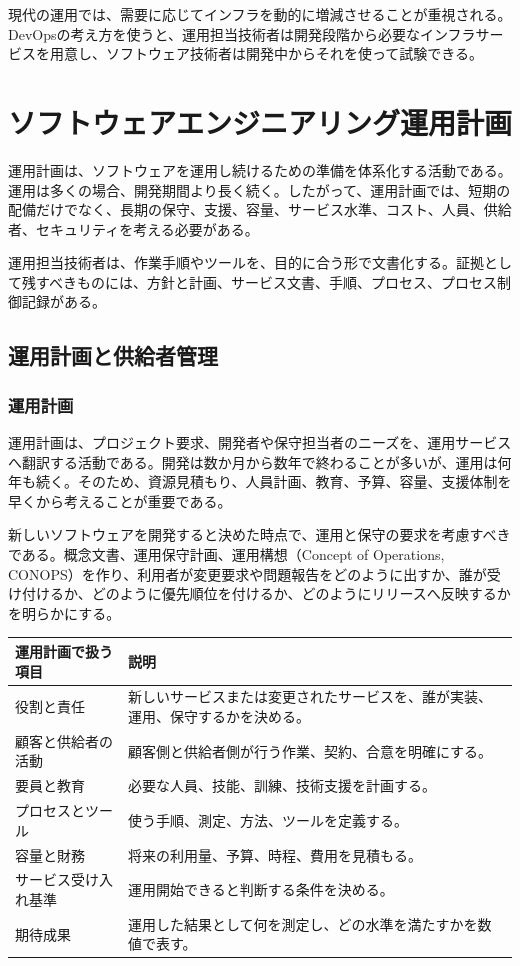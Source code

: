 \documentclass[uplatex,dvipdfmx,a4paper,10pt]{jsarticle}
\begin{document}
現代の運用では、需要に応じてインフラを動的に増減させることが重視される。DevOpsの考え方を使うと、運用担当技術者は開発段階から必要なインフラサービスを用意し、ソフトウェア技術者は開発中からそれを使って試験できる。

\section{ソフトウェアエンジニアリング運用計画}

運用計画は、ソフトウェアを運用し続けるための準備を体系化する活動である。運用は多くの場合、開発期間より長く続く。したがって、運用計画では、短期の配備だけでなく、長期の保守、支援、容量、サービス水準、コスト、人員、供給者、セキュリティを考える必要がある。

運用担当技術者は、作業手順やツールを、目的に合う形で文書化する。証拠として残すべきものには、方針と計画、サービス文書、手順、プロセス、プロセス制御記録がある。

\subsection{運用計画と供給者管理}

\subsubsection{運用計画}

運用計画は、プロジェクト要求、開発者や保守担当者のニーズを、運用サービスへ翻訳する活動である。開発は数か月から数年で終わることが多いが、運用は何年も続く。そのため、資源見積もり、人員計画、教育、予算、容量、支援体制を早くから考えることが重要である。

新しいソフトウェアを開発すると決めた時点で、運用と保守の要求を考慮すべきである。概念文書、運用保守計画、運用構想（Concept of Operations, CONOPS）を作り、利用者が変更要求や問題報告をどのように出すか、誰が受け付けるか、どのように優先順位を付けるか、どのようにリリースへ反映するかを明らかにする。

\begin{longtable}{L{45mm}L{105mm}}
\toprule
運用計画で扱う項目 & 説明 \\
\midrule
役割と責任 & 新しいサービスまたは変更されたサービスを、誰が実装、運用、保守するかを決める。 \\
顧客と供給者の活動 & 顧客側と供給者側が行う作業、契約、合意を明確にする。 \\
要員と教育 & 必要な人員、技能、訓練、技術支援を計画する。 \\
プロセスとツール & 使う手順、測定、方法、ツールを定義する。 \\
容量と財務 & 将来の利用量、予算、時程、費用を見積もる。 \\
サービス受け入れ基準 & 運用開始できると判断する条件を決める。 \\
期待成果 & 運用した結果として何を測定し、どの水準を満たすかを数値で表す。 \\
\bottomrule
\end{longtable}
\end{document}
